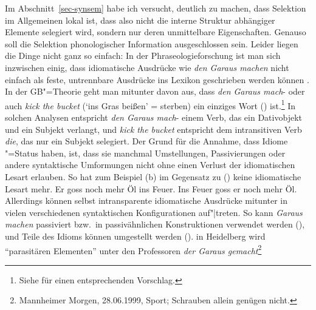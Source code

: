 %
Im Abschnitt~\ref{sec-synsem} habe ich versucht, deutlich zu machen, dass Selektion im Allgemeinen
lokal ist, dass also nicht die interne Struktur abhängiger Elemente selegiert
wird, sondern nur deren unmittelbare Eigenschaften. Genauso soll die Selektion phonologischer
Information ausgeschlossen sein. Leider liegen die Dinge nicht ganz so einfach:
In der Phraseologieforschung ist man sich inzwischen einig, dass idiomatische Ausdrücke wie
\emph{den Garaus machen} nicht einfach als feste, untrennbare Ausdrücke ins Lexikon geschrieben werden
können \citep*{NSW94a,Burger98a}. In der GB"=Theorie geht man mitunter davon aus, dass \emph{den Garaus mach}- oder
auch \emph{kick the bucket} (`ins Gras beißen' = sterben) ein einziges Wort (\vnull) ist.\footnote{
  Siehe \zb {} für einen entsprechenden Vorschlag.%
}
In solchen Analysen entspricht \emph{den Garaus mach}- einem Verb, das ein Dativobjekt und ein Subjekt verlangt,
und \emph{kick the bucket} entspricht dem intransitiven Verb \emph{die}, das nur ein Subjekt
selegiert. Der Grund für die Annahme, dass Idiome \vnull"=Status haben, ist, dass sie manchmal
Umstellungen, Passivierungen oder andere syntaktische Umformungen nicht ohne einen Verlust der
idiomatischen Lesart erlauben. So hat zum Beispiel (b) im Gegensatz zu () keine
idiomatische Lesart mehr.
\eal
\ex Er goss noch mehr Öl ins Feuer.
\ex Ins Feuer goss er noch mehr Öl.
\zl
Allerdings können selbst intransparente idiomatische Ausdrücke mitunter in vielen verschiedenen syntaktischen Konfigurationen auf"|treten.
So kann \emph{Garaus machen} \zb passiviert bzw.\ in passivähnlichen Konstruktionen
verwendet werden (), und Teile des Idioms können umgestellt werden ().
\largerpage
\ea
in Heidelberg wird "`parasitären Elementen"' unter den Professoren \emph{der Garaus gemacht}\footnote{
Mannheimer Morgen, 28.06.1999, Sport; Schrauben allein genügen nicht.%
}
\z

